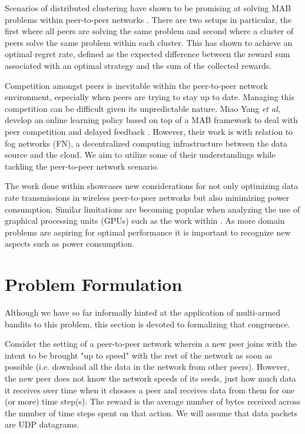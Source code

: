 \documentclass{article}
\begin{document}
Scenarios of distributed clustering have shown to be promising at solving MAB problems within peer-to-peer networks \cite{dist_clustering_p2p}. There are two setups in 
particular, the first where all peers are solving the same problem and second where a cluster of peers solve the same problem within each cluster. This has shown to achieve 
an optimal regret rate, defined as the expected difference between the reward sum associated with an optimal strategy and the sum of the collected rewards. 

Competition amongst peers is inevitable within the peer-to-peer network environment, especially when peers are trying to stay up to date. Managing this competition can be 
difficult given its unpredictable nature. Miao Yang \textit{et al}, develop an online learning policy based on top of a MAB framework to deal with peer competition and 
delayed feedback \cite{p2p_offloading_with_delayed_feedback}. However, their work is with relation to fog networks (FN), a decentralized computing infrastructure between 
the data source and the cloud. We aim to utilize some of their understandings while tackling the peer-to-peer network scenario. 

The work done within \cite{p2p_net_sender_scheduling} showcases new considerations for not only optimizing data rate transmissions in wireless peer-to-peer networks but also 
minimizing power consumption. Similar limitations are becoming popular when analyzing the use of graphical processing units (GPUs) such as the work within \cite{gpu_eng}. As 
more domain problems are aspiring for optimal performance it is important to recognize new aspects such as power consumption. 



\section{Problem Formulation}

Although we have so far informally hinted at the application of multi-armed bandits to this problem, this section is devoted to formalizing that congruence.

Consider the setting of a peer-to-peer network wherein a new peer joins with the intent to be brought "up to speed" with the rest of the network as soon as 
possible (i.e. download all the data in the network from other peers). However, the new peer does not know the network speeds of its seeds, just how much data 
it receives over time when it chooses a peer and receives data from them for one (or more) time step(s). The reward is the average number of bytes received across 
the number of time steps spent on that action. We will assume that data packets are UDP datagrams.
\end{document}

